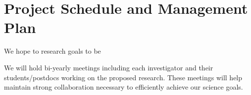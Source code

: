 \section{Project Schedule and Management Plan}

We hope to  research goals to be 

We will  hold bi-yearly meetings including each investigator and their students/postdocs working on the proposed research. These meetings will help maintain strong collaboration necessary to efficiently achieve our science goals.

